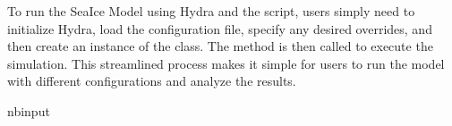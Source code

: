 \documentclass[a4paper,11pt,english,openany]{sphinxmanual}
\begin{document}
\sphinxAtStartPar
To run the Sea\sphinxhyphen{}Ice Model using Hydra and the  script, users simply need to initialize Hydra, load the configuration file, specify any desired overrides, and then create an instance of the  class. The  method is then called to execute the simulation. This streamlined process makes it simple for users to run the model with different configurations and analyze the results.

\begin{sphinxuseclass}{nbinput}
{
\begin{sphinxVerbatim}[commandchars=\\\{\}]
\llap{\color{nbsphinxin}[8]:\,\hspace{\fboxrule}\hspace{\fboxsep}}  
      
        \PYG{p}{[}  \PYG{p}{]}
       
       
\end{sphinxVerbatim}
}

\end{sphinxuseclass}
\end{document}
